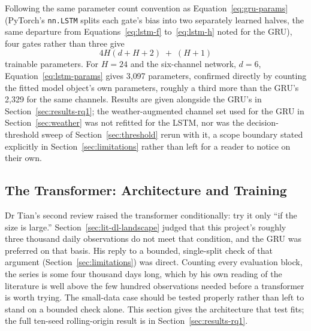 \documentclass[12pt,a4paper]{report}
\begin{document}
Following the same parameter count convention as Equation~\ref{eq:gru-params}
(PyTorch's \texttt{nn.LSTM} splits each gate's bias into two separately
learned halves, the same departure from Equations~\ref{eq:lstm-f}
to~\ref{eq:lstm-h} noted for the GRU), four gates rather than three give
\begin{equation}
4H(d+H+2) \;+\; (H+1)
\label{eq:lstm-params}
\end{equation}
trainable parameters. For $H=24$ and the six-channel network, $d=6$,
Equation~\ref{eq:lstm-params} gives 3{,}097 parameters, confirmed directly
by counting the fitted model object's own parameters, roughly a third more
than the GRU's 2{,}329 for the same channels. Results are given alongside
the GRU's in Section~\ref{sec:results-rq1}; the weather-augmented channel
set used for the GRU in Section~\ref{sec:weather} was not refitted for the
LSTM, nor was the decision-threshold sweep of
Section~\ref{sec:threshold} rerun with it, a scope boundary stated
explicitly in Section~\ref{sec:limitations} rather than left for a reader
to notice on their own.

\subsection{The Transformer: Architecture and Training}
\label{sec:transformer}

Dr Tian's second review raised the transformer conditionally: try it only
``if the size is large.'' Section~\ref{sec:lit-dl-landscape} judged that
this project's roughly three thousand daily observations do not meet that
condition, and the GRU was preferred on that basis. His reply to a bounded,
single-split check of that argument (Section~\ref{sec:limitations}) was
direct. Counting every evaluation block, the series is some four thousand
days long, which by his own reading of the literature is well above the few
hundred observations needed before a transformer is worth trying. The
small-data case should be tested properly rather than left to stand on a
bounded check alone. This section gives the architecture that test fits;
the full ten-seed rolling-origin result is in Section~\ref{sec:results-rq1}.
\end{document}
